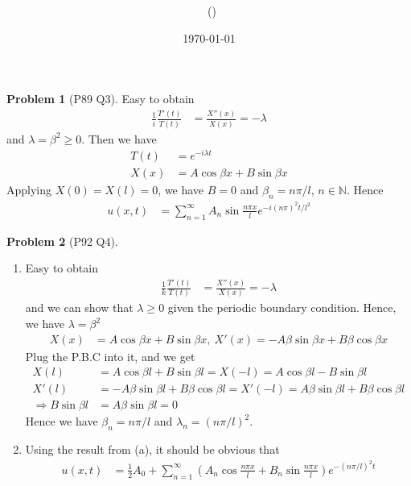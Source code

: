 \documentclass[twoside,11pt]{article}
\title{{\sffamily \Code \ \Ass}}
\author{\sffamily \name \ (\href{mailto:\mail}{\mail})}
\date{\sffamily \today}
\makeatletter
\newcommand{\N}{\mathbb{N}}
\theoremstyle{definition}
\newtheorem{problem}{Problem}
\theoremstyle{remark}
\newtheorem*{remark}{Remark}
\renewcommand{\maketitle}{\bgroup\setlength{\parindent}{0pt}
\begin{flushleft}
  \textbf{\Large\@title}

  \@author
\end{flushleft}\egroup
}
\makeatother
\begin{document}
\maketitle
\thispagestyle{title}




\begin{problem}[P89 Q3]
Easy to obtain
\begin{align*}
    \frac{1}{i}\frac{T'(t)}{T(t)} &= \frac{X''(x)}{X(x)} = -\lambda
\end{align*}
and $\lambda=\beta^2\geq 0$.
Then we have
\begin{align*}
    T(t) &= e^{-i\lambda t}\\
    X(x) &= A\cos\beta x + B\sin\beta x
\end{align*}
Applying $X(0) = X(l) = 0$, we have $B=0$ and $\beta_n=n\pi/l$, $n\in\N$.
Hence
\begin{align*}
    u(x,t) &= \sum_{n=1}^\infty A_n\sin\frac{n\pi x}{l}e^{-i(n\pi)^2t/l^2}
\end{align*}
\end{problem}


\begin{problem}[P92 Q4]\
\begin{enumerate}[label=(\alph*)]
\item Easy to obtain
\begin{align*}
    \frac{1}{k}\frac{T'(t)}{T(t)} &= \frac{X''(x)}{X(x)} = -\lambda
\end{align*}
and we can show that $\lambda\geq 0$ given the periodic boundary condition.
Hence, we have $\lambda=\beta^2$ 
\begin{align*}
    X(x) &= A\cos\beta x + B\sin\beta x,\ 
    X'(x) = -A\beta\sin\beta x + B\beta\cos\beta x
\end{align*}
Plug the P.B.C into it, and we get
\begin{align*}
    X(l) &= A\cos\beta l + B\sin\beta l = X(-l) = A\cos\beta l - B\sin\beta l \\
    X'(l) &= -A\beta\sin\beta l + B\beta\cos\beta l = X'(-l) = A\beta\sin\beta l
    + B\beta\cos\beta l\\
    \Rightarrow B\sin\beta l &= A\beta\sin\beta l = 0
\end{align*}
Hence we have $\beta_n = n\pi/l$ and $\lambda_n = (n\pi/l)^2$.

\item Using the result from (a), it should be obvious that
\begin{align*}
    u(x, t) &= \frac{1}{2}A_0 + \sum_{n=1}^\infty \left(
        A_n\cos\frac{n\pi x}{l} + B_n\sin\frac{n\pi x}{l}
    \right) e^{-(n\pi/l)^2 t}
\end{align*}
\end{enumerate}
\end{problem}
\end{document}
